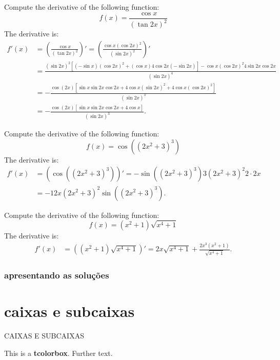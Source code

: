 \cleardoublepage\documentclass[../main.tex]{subfiles}
\begin{document}
\begin{exercise}
Compute the derivative of the following function:
\begin{equation*}
f(x)=\frac{\cos x}{(\tan 2x)^2}
\end{equation*}
\tcblower
The derivative is:
\begin{align*}
f'(x) &= \left( \frac{\cos x}{(\tan 2x)^2} \right)'
= \left( \frac{\cos x (\cos 2x)^2}{(\sin 2x)^2} \right)'\\
&= \frac{(\sin 2x)^2 [(-\sin x)(\cos 2x)^2+(\cos x)4\cos 2x (-\sin 2x)]
- \cos x (\cos 2x)^2 4\sin 2x \cos 2x}{(\sin 2x)^4}\\
&= -\frac{\cos(2x) [\sin x \sin 2x \cos 2x+ 4\cos x(\sin 2x)^2
+ 4 \cos x (\cos 2x)^2]}{(\sin 2x)^3}\\
&= -\frac{\cos(2x) [\sin x \sin 2x \cos 2x+ 4\cos x]}{(\sin 2x)^3}.
\end{align*}
\end{exercise}
\begin{exercise}
Compute the derivative of the following function:
\begin{equation*}
f(x)=\cos((2x^2+3)^3)
\end{equation*}
\tcblower
The derivative is:
\begin{align*}
f'(x) &= \left( \cos((2x^2+3)^3) \right)'
=-\sin((2x^2+3)^3) 3(2x^2+3)^2 2\cdot 2x\\
&=-12x(2x^2+3)^2\sin((2x^2+3)^3).
\end{align*}
\end{exercise}
\begin{exercise}
Compute the derivative of the following function:
\begin{equation*}
f(x)=(x^2+1)\sqrt{x^4+1}
\end{equation*}
\tcblower
The derivative is:
\begin{align*}
f'(x) &= \left( (x^2+1)\sqrt{x^4+1} \right)'
= 2x\sqrt{x^4+1} + \frac{2x^3(x^2+1)}{\sqrt{x^4+1}}.
\end{align*}
\end{exercise}
\tcbstoprecording %

\subsubsection{apresentando as soluções}
\tcbinputrecords





\section{caixas e subcaixas}
CAIXAS E SUBCAIXAS
\begin{tcolorbox}[title=My title,
colback=red!5!white,
colframe=red!75!black,
colbacktitle=yellow!50!red,
coltitle=red!25!black,
fonttitle=\bfseries]
This is a \textbf{tcolorbox}.
Further text.
\end{tcolorbox}
\end{document}
